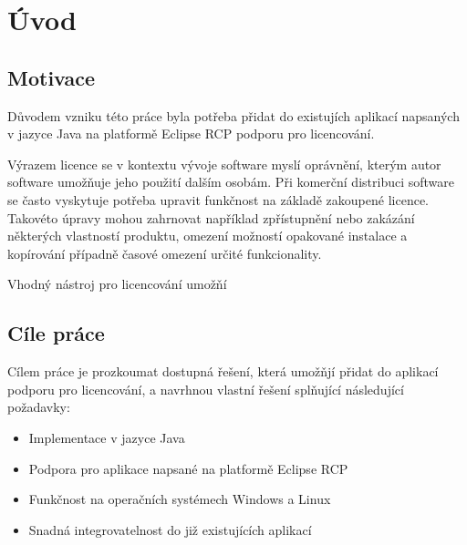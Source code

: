 \chapter{Úvod}

\section{Motivace}

Důvodem vzniku této práce byla potřeba přidat do existujích aplikací napsaných
v jazyce Java na platformě Eclipse RCP podporu pro licencování.

Výrazem licence se v kontextu vývoje software myslí oprávnění, kterým autor
software umožňuje jeho použití dalším osobám. Při komerční distribuci software
se často vyskytuje potřeba upravit funkčnost na základě zakoupené licence.
Takovéto úpravy mohou zahrnovat například zpřístupnění nebo zakázání některých
vlastností produktu, omezení možností opakované instalace a kopírování případně
časové omezení určité funkcionality.

Vhodný nástroj pro licencování umožňí 

 
	
\section{Cíle práce}
Cílem práce je prozkoumat dostupná řešení, která umožňjí přidat do aplikací
podporu pro licencování, a navrhnou vlastní řešení splňující následující
požadavky:
\begin{itemize}
  \item Implementace v jazyce Java
  \item Podpora pro aplikace napsané na platformě Eclipse RCP
  \item Funkčnost na operačních systémech Windows a Linux
  \item Snadná integrovatelnost do již existujících aplikací
\end{itemize}
